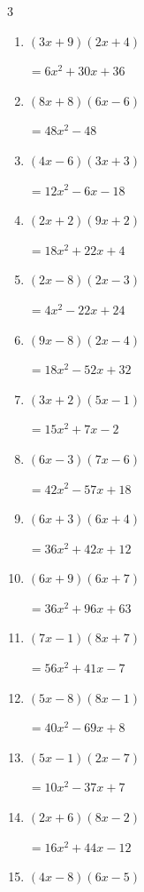 \begin{multicols}{3}
\begin{enumerate}
        $=56x^{2}+70x+14$

\columnbreak %

\resetques

  \item $(3x+9)(2x+4)$

        $=6x^{2}+30x+36$

  \item $(8x+8)(6x-6)$

        $=48x^{2}-48$

  \item $(4x-6)(3x+3)$

        $=12x^{2}-6x-18$

  \item $(2x+2)(9x+2)$

        $=18x^{2}+22x+4$

  \item $(2x-8)(2x-3)$

        $=4x^{2}-22x+24$

  \item $(9x-8)(2x-4)$

        $=18x^{2}-52x+32$

  \item $(3x+2)(5x-1)$

        $=15x^{2}+7x-2$

  \item $(6x-3)(7x-6)$

        $=42x^{2}-57x+18$

  \item $(6x+3)(6x+4)$

        $=36x^{2}+42x+12$

  \item $(6x+9)(6x+7)$

        $=36x^{2}+96x+63$

  \item $(7x-1)(8x+7)$

        $=56x^{2}+41x-7$

  \item $(5x-8)(8x-1)$

        $=40x^{2}-69x+8$

  \item $(5x-1)(2x-7)$

        $=10x^{2}-37x+7$

  \item $(2x+6)(8x-2)$

        $=16x^{2}+44x-12$

  \item $(4x-8)(6x-5)$


\end{enumerate}
\end{multicols}
